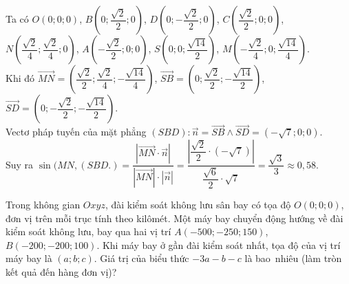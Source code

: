 \begin{bt}
{		Ta có $O(0; 0; 0)$, $B\left(0; \dfrac{\sqrt{2}}{2}; 0\right)$, $D\left(0;-\dfrac{\sqrt{2}}{2}; 0\right)$, $C\left(\dfrac{\sqrt{2}}{2}; 0; 0\right)$, $N\left(\dfrac{\sqrt{2}}{4};  \dfrac{\sqrt{2}}{4}; 0\right)$, $A\left(-\dfrac{\sqrt{2}}{2}; 0; 0\right)$, $S\left(0; 0; \dfrac{\sqrt{14}}{2}\right)$, $M\left(-\dfrac{\sqrt{2}}{4}; 0; \dfrac{\sqrt{14}}{4}\right)$.\\
		Khi đó $\overrightarrow{MN}=\left(\dfrac{\sqrt{2}}{2}; \dfrac{\sqrt{2}}{4};-\dfrac{\sqrt{14}}{4}\right)$,  $\overrightarrow{SB}=\left(0; \dfrac{\sqrt{2}}{2};-\dfrac{\sqrt{14}}{2}\right)$, $\overrightarrow{SD}=\left(0;-\dfrac{\sqrt{2}}{2};-\dfrac{\sqrt{14}}{2}\right)$.\\
		Vectơ pháp tuyến  của mặt phẳng $(SBD)\colon \overrightarrow{n}=\overrightarrow{SB} \wedge \overrightarrow{SD}=(-\sqrt{7}; 0; 0)$.\\
		Suy ra $\sin (MN,(SBD.)=\dfrac{|\overrightarrow{MN} \cdot \overrightarrow{n}|}{|\overrightarrow{MN}|\cdot|\overrightarrow{n}|}=\dfrac{\left|\dfrac{\sqrt{2}}{2} \cdot(-\sqrt{7})\right|}{\dfrac{\sqrt{6}}{2} \cdot \sqrt{7}}=\dfrac{\sqrt{3}}{3} \approx  0{,}58$.
	} 
\end{bt}

\begin{bt}%
	Trong không gian $Oxyz$, đài kiểm soát không lưu sân bay có tọa độ $O(0;0;0)$, đơn vị trên mỗi trục tính theo kilômét. Một máy bay chuyển động hướng về đài kiểm soát không lưu, bay qua hai vị trí $A(-500;-250;150)$, $B(-200;-200;100)$. Khi máy bay ở gần  đài kiểm soát nhất, tọa độ của vị trí máy bay là $(a;b;c)$. Giá trị của biểu thức $-3a-b-c$ là bao~nhiêu (làm tròn kết quả đến hàng đơn vị)?
\end{bt}

